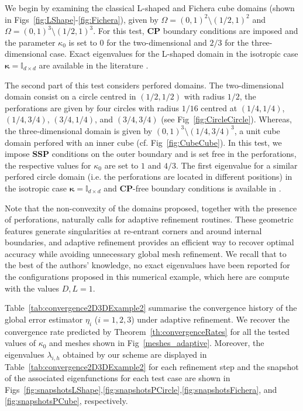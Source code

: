 \documentclass[final,reqno]{elsarticle}
\def\bkappa{\boldsymbol{\kappa}}
\begin{document}
We begin by examining the classical L-shaped and Fichera cube domains (shown in Figs~\ref{fig:LShape}-\ref{fig:Fichera}), given by $\Omega=(0,1)^2 \setminus (1/2,1)^2$ and $\Omega = (0,1)^3 \setminus (1/2,1)^3$. For this test, \textbf{CP} boundary conditions are imposed and the parameter $\kappa_0$ is set to 0 for the two-dimensional and $2/3$ for the three-dimensional case. Exact eigenvalues for the L-shaped domain in the isotropic case $\bkappa=\mathbb{I}_{d\times d}$ are available in the literature \cite{MoraVelasquez2020}. 

The second part of this test considers perfored domains. The two-dimensional domain consist on a circle centred in $(1/2,1/2)$ with radius $1/2$, the perforations are given by four circles with radius $1/16$ centred at $(1/4,1/4)$, $(1/4,3/4)$, $(3/4,1/4)$, and $(3/4,3/4)$ (see Fig~\ref{fig:CircleCircle}). Whereas, the three-dimensional domain is given by $(0,1)^3\setminus(1/4,3/4)^3$, a unit cube domain perfored with an inner cube (cf. Fig~\ref{fig:CubeCube}). In this test, we impose \textbf{SSP} conditions on the outer  boundary and is set free in the perforations, the respective values for $\kappa_0$ are set to $1$ and $4/3$. The first eigenvalue for a similar perfored circle domain (i.e. the perforations are located in different positions) in the isotropic case $\bkappa=\mathbb{I}_{d\times d}$ and \textbf{CP}-free boundary conditions is available in \cite{ADAK2023115763}. 

Note that the non-convexity of the domains proposed, together with the presence of perforations, naturally calls for adaptive refinement routines. These geometric features generate singularities at re-entrant corners and around internal boundaries, and adaptive refinement provides an efficient way to recover optimal accuracy while avoiding unnecessary global mesh refinement. We recall that to the best of the authors’ knowledge, no exact eigenvalues have been reported for the configurations proposed in this numerical example, which here are compute with the values $D,L=1$. 

Table~\ref{tab:convergence2D3DExample2} summarise the convergence history of the global error estimator $\eta_i$ ($i=1,2,3$) under adaptive refinement. We recover the convergence rate predicted by Theorem~\ref{th:convergenceRates} for all the tested values of $\kappa_0$ and meshes shown in Fig~\ref{meshes_adaptive}. Moreover, the eigenvalues $\lambda_{i,h}$ obtained by our scheme are displayed in Table~\ref{tab:convergence2D3DExample2} for each refinement step and the snapshot of the associated eigenfunctions for each test case are shown in Figs~\ref{fig:snapshotsLShape},\ref{fig:snapshotsPCircle},\ref{fig:snapshotsFichera}, and \ref{fig:snapshotsPCube}, respectively. 
\end{document}
